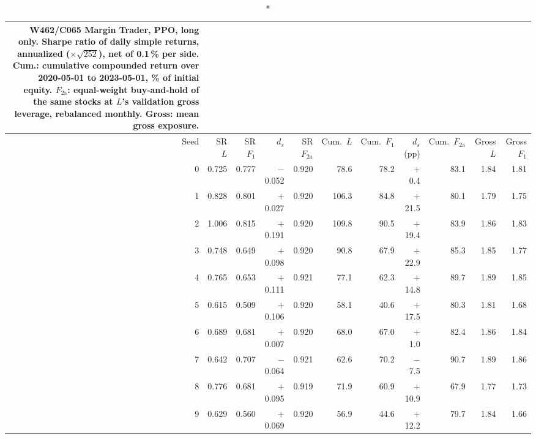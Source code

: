 \begin{longtable}{@{}rrrrrrrrrrr@{}}
\caption*{\small W462/C065 Margin Trader, PPO, long only. Sharpe ratio of daily simple returns, annualized ($\times\sqrt{252}$), net of 0.1\,\% per side. Cum.: cumulative compounded return over 2020-05-01 to 2023-05-01, \% of initial equity. $F_{2\mathrm{a}}$: equal-weight buy-and-hold of the same stocks at $L$'s validation gross leverage, rebalanced monthly. Gross: mean gross exposure.}\\
\toprule
Seed & SR $L$ & SR $F_1$ & $d_s$ & SR $F_{2\mathrm{a}}$ & Cum.\ $L$ & Cum.\ $F_1$ & $d_s$ (pp) & Cum.\ $F_{2\mathrm{a}}$ & Gross $L$ & Gross $F_1$\\ \midrule\endhead
0 & 0.725 & 0.777 & $-$0.052 & 0.920 & 78.6 & 78.2 & $+$0.4 & 83.1 & 1.84 & 1.81\\
1 & 0.828 & 0.801 & $+$0.027 & 0.920 & 106.3 & 84.8 & $+$21.5 & 80.1 & 1.79 & 1.75\\
2 & 1.006 & 0.815 & $+$0.191 & 0.920 & 109.8 & 90.5 & $+$19.4 & 83.9 & 1.86 & 1.83\\
3 & 0.748 & 0.649 & $+$0.098 & 0.920 & 90.8 & 67.9 & $+$22.9 & 85.3 & 1.85 & 1.77\\
4 & 0.765 & 0.653 & $+$0.111 & 0.921 & 77.1 & 62.3 & $+$14.8 & 89.7 & 1.89 & 1.85\\
5 & 0.615 & 0.509 & $+$0.106 & 0.920 & 58.1 & 40.6 & $+$17.5 & 80.3 & 1.81 & 1.68\\
6 & 0.689 & 0.681 & $+$0.007 & 0.920 & 68.0 & 67.0 & $+$1.0 & 82.4 & 1.86 & 1.84\\
7 & 0.642 & 0.707 & $-$0.064 & 0.921 & 62.6 & 70.2 & $-$7.5 & 90.7 & 1.89 & 1.86\\
8 & 0.776 & 0.681 & $+$0.095 & 0.919 & 71.9 & 60.9 & $+$10.9 & 67.9 & 1.77 & 1.73\\
9 & 0.629 & 0.560 & $+$0.069 & 0.920 & 56.9 & 44.6 & $+$12.2 & 79.7 & 1.84 & 1.66\\
\bottomrule\end{longtable}
